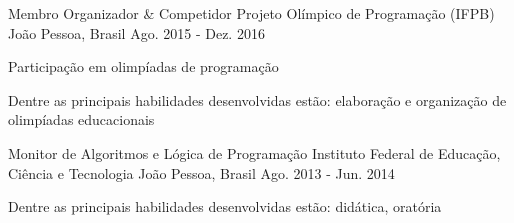 \begin{cventries}
      \cventry
        {Membro Organizador \& Competidor} %
        {Projeto Olímpico de Programação (IFPB)} %
        {João Pessoa, Brasil} %
        {Ago. 2015 - Dez. 2016} %
        {
          \begin{cvitems} %
            \item {Participação em olimpíadas de programação}
            \item {Dentre as principais habilidades desenvolvidas estão: elaboração e organização de olimpíadas educacionais}
          \end{cvitems}
        }
%

  \cventry
    {Monitor de Algoritmos e Lógica de Programação} %
    {Instituto Federal de Educação, Ciência e Tecnologia} %
    {João Pessoa, Brasil} %
    {Ago. 2013 - Jun. 2014} %
    {
      \begin{cvitems} %
        \item {Dentre as principais habilidades desenvolvidas estão: didática, oratória}
      \end{cvitems}
    }
\end{cventries}
